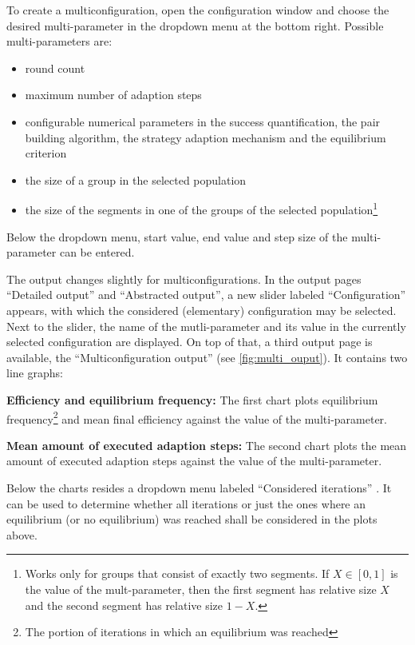 \documentclass[parskip=full,11pt]{scrartcl}
\newcommand*\circled[1]{\tikz[baseline=(char.base)]{
            \node[shape=circle,draw,inner sep=2pt] (char) {#1};}}
\begin{document}
To create a multiconfiguration, open the configuration window and choose the desired multi-parameter in the dropdown menu at the bottom right. Possible multi-parameters are:
\begin{itemize}
\item round count
\item maximum number of adaption steps
\item configurable numerical parameters in the success quantification, the pair building algorithm, the strategy adaption mechanism and the equilibrium criterion
\item the size of a group in the selected population
\item the size of the segments in one of the groups of the selected population\footnote{Works only for groups that consist of exactly two segments. If \(X \in [0,1]\) is the value of the mult-parameter, then the first segment has relative size \(X\) and the second segment has relative size \(1 - X\).}
\end{itemize}

Below the dropdown menu, start value, end value and step size of the multi-parameter can be entered.

The output changes slightly for multiconfigurations. In the output pages \enquote{Detailed output} and \enquote{Abstracted output}, a new slider labeled \enquote{Configuration} appears, with which the considered (elementary) configuration may be selected. Next to the slider, the name of the mutli-parameter and its value in the currently selected configuration are displayed. On top of that, a third output page is available, the \enquote{Multiconfiguration output} (see \ref{fig:multi_ouput}). It contains two line graphs:

\textbf{Efficiency and equilibrium frequency:} The first chart plots equilibrium frequency\footnote{The portion of iterations in which an equilibrium was reached} and mean final efficiency against the value of the multi-parameter.

\textbf{Mean amount of executed adaption steps:} The second chart plots the mean amount of executed adaption steps against the value of the multi-parameter.

Below the charts resides a dropdown menu labeled \enquote{Considered iterations} \circled{4}. It can be used to determine whether all iterations or just the ones where an equilibrium (or no equilibrium) was reached shall be considered in the plots above.
\end{document}
